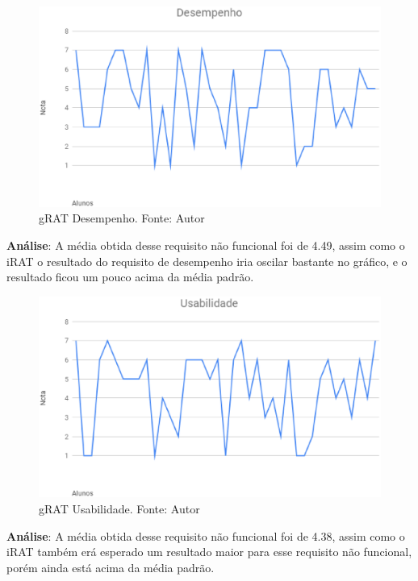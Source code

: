 \begin{figure}[H]
	\centering
  \includegraphics[keepaspectratio=true,scale=0.5]{figuras/gRAT_Desempenho.eps}
  \caption[gRAT Desempenho.]{gRAT Desempenho. Fonte: Autor}
\end{figure}

\textbf{Análise}: A média obtida desse requisito não funcional foi de 4.49, assim como o iRAT o
resultado do requisito de desempenho iria oscilar bastante no gráfico, e o resultado ficou um pouco acima da média
  padrão.

\begin{figure}[H]
	\centering
  \includegraphics[keepaspectratio=true,scale=0.5]{figuras/gRAT_Usabilidade.eps}
  \caption[gRAT Usabilidade.]{gRAT Usabilidade. Fonte: Autor}
\end{figure}

\textbf{Análise}: A média obtida desse requisito não funcional foi de 4.38, assim como o iRAT também erá esperado um resultado maior para
esse requisito não funcional, porém ainda está acima da média padrão.

